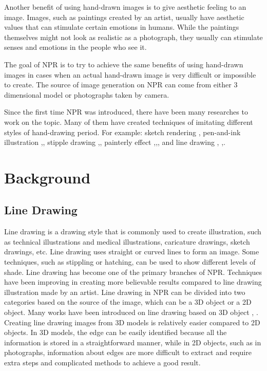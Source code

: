 Another benefit of using hand-drawn images is to give aesthetic feeling to an image. Images, such as paintings created by an artist, usually have aesthetic values that can stimulate certain emotions in humans. While the paintings themselves might not look as realistic as a photograph, they usually can stimulate senses and emotions in the people who see it.

The goal of NPR is to try to achieve the same benefits of using hand-drawn images in cases when an actual hand-drawn image is very difficult or impossible to create. The source of image generation on NPR can come from either 3 dimensional model or photographs taken by camera.

Since the first time NPR was introduced, there have been many researches to work on the topic. Many of them have created techniques of imitating different styles of hand-drawing period. For example: sketch rendering \cite{strothotte94}, pen-and-ink illustration \cite{winkenbach94},\cite{salisbury94}, stipple drawing \cite{secord02},\cite{deussen00}, painterly effect \cite{litwinowicz97},\cite{hertzmann98},\cite{hays04}, and line drawing \cite{decarlo03}, \cite{sousa03},\cite{kang07}.

\section{Background}

\subsection{Line Drawing} 
Line drawing is a drawing style that is commonly used to create illustration, such as technical illustrations and medical illustrations, caricature drawings, sketch drawings, etc. Line drawing uses straight or curved lines to form an image. Some techniques, such as stippling or hatching, can be used to show different levels of shade. Line drawing has become one of the primary branches of NPR. Techniques have been improving in creating more believable results compared to line drawing illustration made by an artist. Line drawing in NPR can be divided into two categories based on the source of the image, which can be a 3D object or a 2D object. Many works have been introduced on line drawing based on 3D object \cite{decarlo03}, \cite{sousa03}. Creating line drawing images from 3D models is relatively easier compared to 2D objects. In 3D models, the edge can be easily identified because all the information is stored in a straightforward manner, while in 2D objects, such as in photographs, information about edges are more difficult to extract and require extra steps and complicated methods to achieve a good result.

